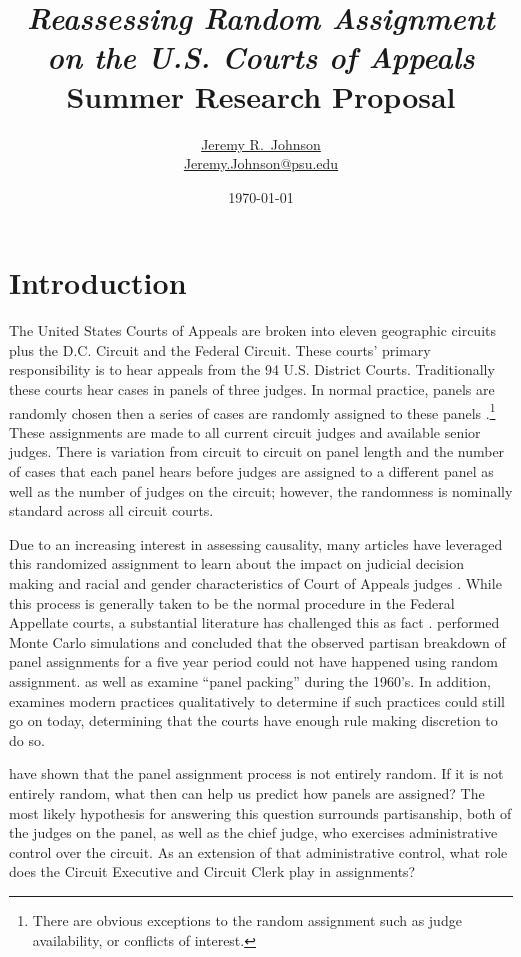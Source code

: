 \documentclass[12pt]{article}
\title{\textit{Reassessing Random Assignment on the U.S. Courts of Appeals}\\ Summer Research Proposal}
\author{\href{http://www.jeremyrjohnson.org/}{Jeremy R.\ Johnson}\\ \href{mailto:Jeremy.Johnson@psu.edu}{Jeremy.Johnson@psu.edu}}
\affil{Pennsylvania State University}
\date{\today}
\begin{document}
\maketitle
\thispagestyle{empty}
\pagebreak

\singlespacing
\setcounter{page}{1}

\section*{Introduction}
The United States Courts of Appeals are broken into eleven geographic circuits plus the D.C. Circuit and the Federal Circuit.  These courts' primary responsibility is to hear appeals from the 94 U.S. District Courts.  Traditionally these courts hear cases in panels of three judges.  In normal practice, panels are randomly chosen then a series of cases are randomly assigned to these panels \citep{Hooper2011, Journalist2011,Chilton2014,Songer2007}.\footnote{There are obvious exceptions to the random assignment such as judge availability, or conflicts of interest.}  These assignments are made to all current circuit judges and available senior judges.  There is variation from circuit to circuit on panel length and the number of cases that each panel hears before judges are assigned to a different panel as well as the number of judges on the circuit; however, the randomness is nominally standard across all circuit courts.  

Due to an increasing interest in assessing causality, many articles have leveraged this randomized assignment to learn about the impact on judicial decision making and racial and gender characteristics of Court of Appeals judges \citep{Kastellec2010,Glynn2015,Farhang2014}.  While this process is generally taken to be the normal procedure in the Federal Appellate courts, a substantial literature has challenged this as fact \citep{Atkins1974,Brown2000,Chilton2014}.  \citet{Chilton2014} performed Monte Carlo simulations and concluded that the observed partisan breakdown of panel assignments for a five year period could not have happened using random assignment.  \citet{Atkins1974} as well as \citet{Brown2000} examine ``panel packing'' during the 1960's.  In addition, \citet{Brown2000} examines modern practices qualitatively to determine if such practices could still go on today, determining that the courts have enough rule making discretion to do so.

\citet{Chilton2014} have shown that the panel assignment process is not entirely random.  If it is not entirely random, what then can help us predict how panels are assigned?  The most likely hypothesis for answering this question surrounds partisanship, both of the judges on the panel, as well as the chief judge, who exercises administrative control over the circuit.  As an extension of that administrative control, what role does the Circuit Executive and Circuit Clerk play in assignments?
\end{document}
